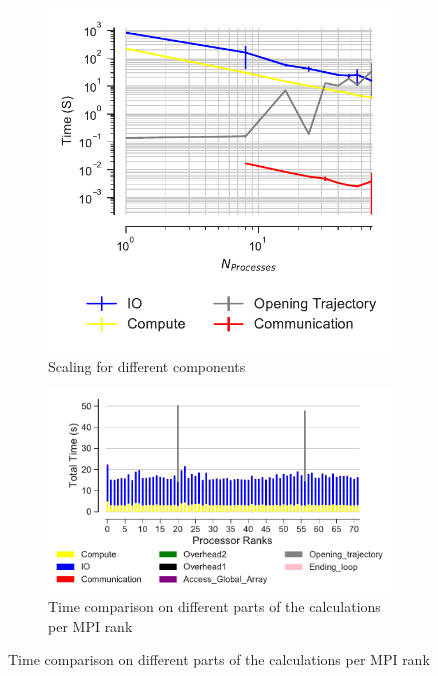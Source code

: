 \begin{figure}[ht!]
\begin{subfigure}{.4\textwidth}
  \includegraphics[width=\linewidth]{figures/RMSD-ga4py-time_IO_comparison.pdf}
\caption{Scaling for different components}
\label{fig:ScalingComputeIO-ga4py}
\end{subfigure}
\hfill
\begin{subfigure} {.5\textwidth}
  \includegraphics[width=\linewidth]{figures/RMSD-ga4py-BarPlot-rank-comparison_72_1.pdf}
  \caption{Time comparison on different parts of the calculations per MPI rank}
  \label{fig:MPIranks-ga4py}
\end{subfigure}


\end{figure}
